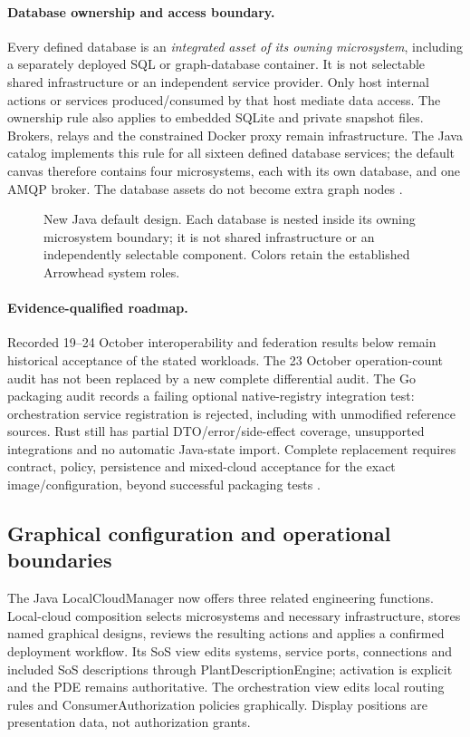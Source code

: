 \documentclass[a4paper]{arrowhead}
\begin{document}
\paragraph{Database ownership and access boundary.}
Every defined database is an \emph{integrated asset of its owning microsystem},
including a separately deployed SQL or graph-database container. It is not
selectable shared infrastructure or an independent service provider. Only host
internal actions or services produced/consumed by that host mediate data access.
The ownership rule also applies to embedded SQLite and private snapshot files.
Brokers, relays and the constrained Docker proxy remain infrastructure. The
Java catalog implements this rule for all sixteen defined database services;
the default canvas therefore contains four microsystems, each with its own
database, and one AMQP broker. The database assets do not become extra graph
nodes \cite{javaDatabaseAssets20261030}.

\begin{figure}[htbp]
\centering

\caption{New Java default design. Each database is nested inside its owning
microsystem boundary; it is not shared infrastructure or an independently
selectable component. Colors retain the established Arrowhead system roles.}
\label{fig:default-owned-assets}
\end{figure}
\FloatBarrier

\paragraph{Evidence-qualified roadmap.}
Recorded 19--24 October interoperability and federation results below remain
historical acceptance of the stated workloads. The 23 October operation-count
audit has not been replaced by a new complete differential audit. The Go
packaging audit records a failing optional native-registry integration test:
orchestration service registration is rejected, including with unmodified
reference sources. Rust still has partial DTO/error/side-effect coverage,
unsupported integrations and no automatic Java-state import. Complete
replacement requires contract, policy, persistence and mixed-cloud acceptance
for the exact image/configuration, beyond successful packaging tests
\cite{goPackaging20261028,rustPackaging20261028,nativeCompatibility20261024}.

\subsection{Graphical configuration and operational boundaries}
\label{sec:configuration-update}
The Java LocalCloudManager now offers three related engineering functions.
Local-cloud composition selects microsystems and necessary infrastructure,
stores named graphical designs, reviews the resulting actions and applies a
confirmed deployment workflow. Its SoS view edits systems, service ports,
connections and included SoS descriptions through PlantDescriptionEngine;
activation is explicit and the PDE remains authoritative. The orchestration
view edits local routing rules and ConsumerAuthorization policies graphically.
Display positions are presentation data, not authorization grants.
\end{document}
